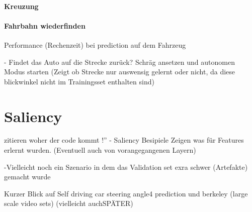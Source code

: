 \paragraph{Kreuzung}

\paragraph{Fahrbahn wiederfinden}

Performance (Rechenzeit) bei prediction auf dem Fahrzeug


- Findet das Auto auf die Strecke zurück? Schräg ansetzen und autonomen Modus starten
(Zeigt ob Strecke nur auswensig gelernt oder nicht, da  diese blickwinkel nicht im Trainingsset enthalten sind)

\section{Saliency}

zitieren woher der code kommt !''
- Saliency Besipiele Zeigen was für Features erlernt wurden. (Eventuell auch von vorangegangenen Layern)

-Vielleicht noch ein Szenario in dem das Validation set exra schwer (Artefakte) gemacht wurde




Kurzer Blick auf  Self driving car steering angle4 prediction und berkeley (large scale video sets) (vielleicht auchSPÄTER)